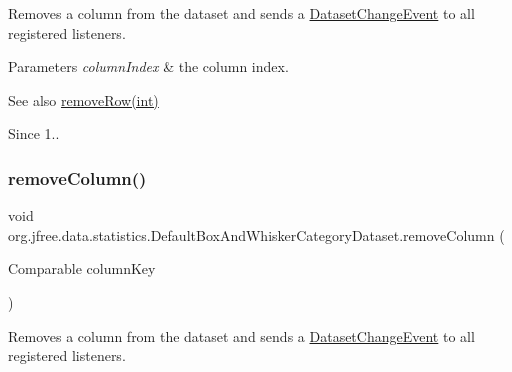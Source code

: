 Removes a column from the dataset and sends a \mbox{\hyperlink{}{Dataset\+Change\+Event}} to all registered listeners.


\begin{DoxyParams}{Parameters}
{\em column\+Index} & the column index.\\
\hline
\end{DoxyParams}
\begin{DoxySeeAlso}{See also}
\mbox{\hyperlink{classorg_1_1jfree_1_1data_1_1statistics_1_1_default_box_and_whisker_category_dataset_af24e62453a400ecb5461a61845ba83e3}{remove\+Row(int)}}
\end{DoxySeeAlso}
\begin{DoxySince}{Since}
1.. 
\end{DoxySince}
\mbox{\label{classorg_1_1jfree_1_1data_1_1statistics_1_1_default_box_and_whisker_category_dataset_a05f866339c950f6f63894e1c04f7badd}} 
\subsubsection{\texorpdfstring{remove\+Column()}{removeColumn()}\hspace{0.1cm}{\footnotesize\ttfamily [2/2]}}
{\footnotesize\ttfamily void org.\+jfree.\+data.\+statistics.\+Default\+Box\+And\+Whisker\+Category\+Dataset.\+remove\+Column (\begin{DoxyParamCaption}\item[{Comparable}]{column\+Key }\end{DoxyParamCaption})}

Removes a column from the dataset and sends a \mbox{\hyperlink{}{Dataset\+Change\+Event}} to all registered listeners.



